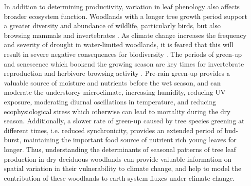 \begin{refsection}
In addition to determining productivity, variation in leaf phenology also affects broader ecosystem function. Woodlands with a longer tree growth period support a greater diversity and abundance of wildlife, particularly birds, but also browsing mammals and invertebrates \citep{Cole2015, Araujo2017, Morellato2016, Ogutu2013}. As climate change increases the frequency and severity of drought in water-limited woodlands, it is feared that this will result in severe negative consequences for biodiversity \citep{Bale2002}. The periods of green-up and senescence which bookend the growing season are key times for invertebrate reproduction \citep{Prather2012} and herbivore browsing activity \citep{Velasque2016, Morellato2016}. Pre-rain green-up provides a valuable source of moisture and nutrients before the wet season, and can moderate the understorey microclimate, increasing humidity, reducing UV exposure, moderating diurnal oscillations in temperature, and reducing ecophysiological stress which otherwise can lead to mortality during the dry season. Additionally, a slower rate of green-up caused by tree species greening at different times, i.e. reduced synchronicity, provides an extended period of bud-burst, maintaining the important food source of nutrient rich young leaves for longer. Thus, understanding the determinants of seasonal patterns of tree leaf production in dry deciduous woodlands can provide valuable information on spatial variation in their vulnerability to climate change, and help to model the contribution of these woodlands to earth system fluxes under climate change.
 

\end{refsection}
